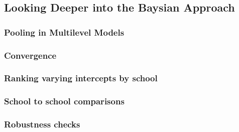 \subsection{Looking Deeper into the Baysian Approach}
\label{section:Deeper}


\subsubsection{Pooling in Multilevel Models}
\subsubsection{Convergence}
\subsubsection{Ranking varying intercepts by school}
\subsubsection{School to school comparisons}
\subsubsection{Robustness checks}






